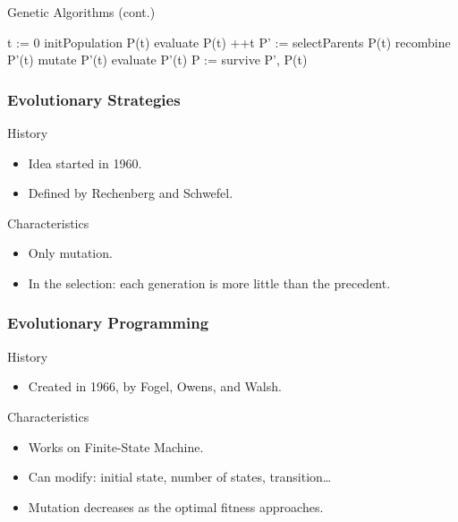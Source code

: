\begin{frame}{Genetic Algorithms (cont.)}
  \begin{algorithm}[H]
    \caption{Genetic Algorithm}
    \begin{algorithmic}
      \State t := 0
      \State initPopulation P(t)
      \State evaluate P(t)
        \State ++t
        \State P' := selectParents P(t)
        \State recombine P'(t)
        \State mutate P'(t)
        \State evaluate P'(t)
        \State P := survive P', P(t)
      \EndWhile
    \end{algorithmic}
  \end{algorithm}
\end{frame}

\begin{frame}
  \frametitle{Evolutionary Strategies}
  \begin{block}{History}
    \begin{itemize}
    \item Idea started in 1960.
    \item Defined by Rechenberg\cite{Rechenberg.1975} and Schwefel\cite{Schwefel.1981}.
    \end{itemize}
  \end{block}

  \begin{block}{Characteristics}
    \begin{itemize}
    \item Only mutation.
    \item In the selection: each generation is more little than the
      precedent.
    \end{itemize}
  \end{block}
\end{frame}


\begin{frame}
  \frametitle{Evolutionary Programming}
  \begin{block}{History}
    \begin{itemize}
      \item Created in 1966, by Fogel, Owens, and Walsh\cite{fogel1966}.
    \end{itemize}
  \end{block}

  \begin{block}{Characteristics}
    \begin{itemize}
    \item Works on Finite-State Machine.
    \item Can modify: initial state, number of states, transition\dots
    \item Mutation decreases as the optimal fitness approaches.
    \end{itemize}
  \end{block}
\end{frame}


